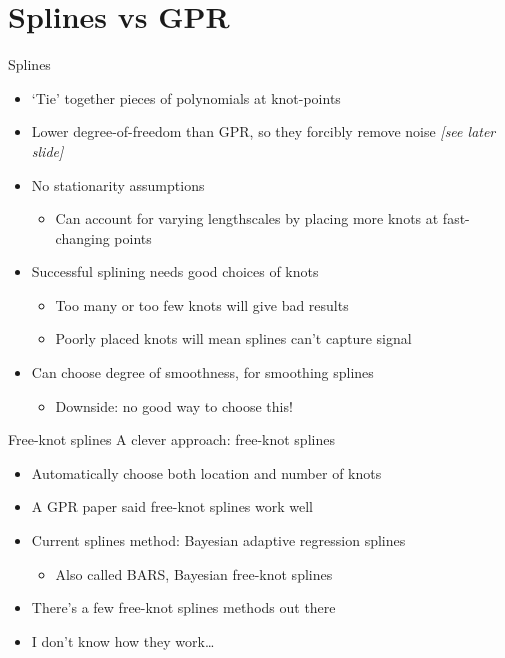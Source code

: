 \documentclass[presentation]{beamer}
\begin{document}
\section{Splines vs GPR}
\label{sec:org1fb8bb5}
\begin{frame}[label={sec:org2d40f28}]{Splines}
\begin{itemize}[<+->]
\item `Tie' together pieces of polynomials at knot-points
\item Lower degree-of-freedom than GPR, so they forcibly remove noise \emph{[see later slide]}
\item No stationarity assumptions
\begin{itemize}
\item Can account for varying lengthscales by placing more knots at fast-changing points
\end{itemize}
\item Successful splining needs good choices of knots
\begin{itemize}
\item Too many or too few knots will give bad results
\item Poorly placed knots will mean splines can't capture signal
\end{itemize}
\item Can choose degree of smoothness, for smoothing splines
\begin{itemize}
\item Downside: no good way to choose this!
\end{itemize}
\end{itemize}
\end{frame}


\begin{frame}[label={sec:org4392278}]{Free-knot splines}
A clever approach: free-knot splines
\begin{itemize}[<+->]
\item Automatically choose both location and number of knots
\item A GPR paper said free-knot splines work well
\item Current splines method: Bayesian adaptive regression splines 
\begin{itemize}
\item Also called BARS, Bayesian free-knot splines
\end{itemize}
\item There's a few free-knot splines methods out there
\item I don't know how they work\ldots{}
\end{itemize}
\end{frame}
\end{document}
